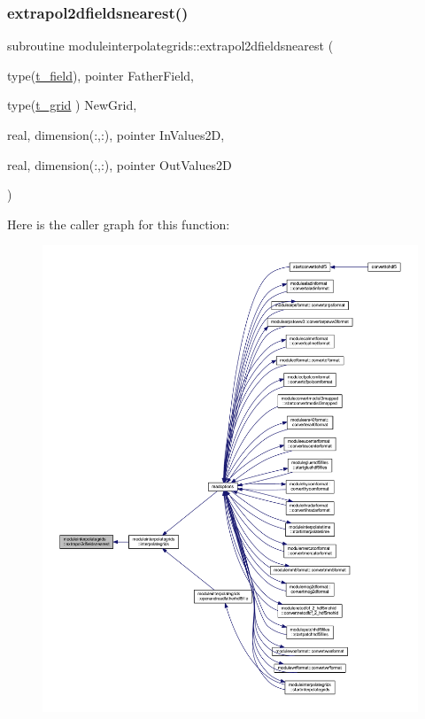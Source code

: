 \subsubsection{\texorpdfstring{extrapol2dfieldsnearest()}{extrapol2dfieldsnearest()}}
{\footnotesize\ttfamily subroutine moduleinterpolategrids\+::extrapol2dfieldsnearest (\begin{DoxyParamCaption}\item[{type(\mbox{\hyperlink{structmoduleinterpolategrids_1_1t__field}{t\+\_\+field}}), pointer}]{Father\+Field,  }\item[{type(\mbox{\hyperlink{structmoduleinterpolategrids_1_1t__grid}{t\+\_\+grid}} )}]{New\+Grid,  }\item[{real, dimension(\+:,\+:), pointer}]{In\+Values2D,  }\item[{real, dimension(\+:,\+:), pointer}]{Out\+Values2D }\end{DoxyParamCaption})\hspace{0.3cm}{\ttfamily [private]}}

Here is the caller graph for this function\+:\nopagebreak
\begin{figure}[H]
\begin{center}
\leavevmode
\includegraphics[width=350pt]{namespacemoduleinterpolategrids_a6f499d806252d62f33788a8d02639319_icgraph}
\end{center}
\end{figure}
\mbox{\label{namespacemoduleinterpolategrids_a8b539cd3b43a2490e5eb54aee6abf1d0}} 
